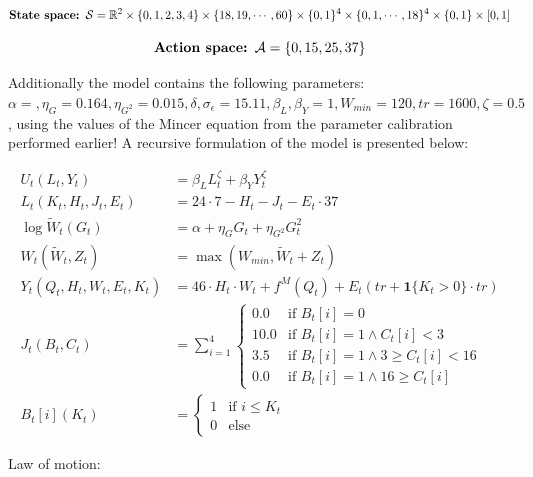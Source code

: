 \begin{equation}
    \textbf{State space: }\mathcal{S} = \mathbb{R}^2 \times \{0, 1, 2, 3, 4\} \times \{18, 19, \cdots , 60\} \times \{0, 1\}^4 \times \{0, 1, \cdots, 18\}^4 \times \{0,1\} \times [0, 1]
\end{equation}

\begin{equation}
    \textbf{Action space: }\mathcal{A} = \{0, 15, 25, 37\}
\end{equation}

Additionally the model contains the following parameters: $\alpha=, \eta_G = 0.164, \eta_{G^{2}}=0.015, \delta, \sigma_\epsilon = 15.11, \beta_L, \beta_Y = 1, W_{min} = 120, tr = 1600, \zeta=0.5$, using the values of the Mincer equation from the parameter calibration performed earlier! A recursive formulation of the model is presented below:

\begin{align}
    U_t(L_t, Y_t) &= \beta_L L_t^{\zeta} + \beta_Y Y_t^{\zeta}\\
    L_t(K_t, H_t, J_t, E_t) &= 24 \cdot 7 - H_t - J_t - E_t \cdot 37\\
    \log \tilde{W}_t (G_t) &= \alpha + \eta_G G_t + \eta_{G^2} G_t^2 \\
    W_t(\tilde{W}_t, Z_t) &= \max(W_{min} , \tilde{W}_t  + Z_t)  \\
    Y_t(Q_t,H_t, W_t, E_t, K_t) &= 46 \cdot H_t \cdot W_t + f^M(Q_t) +  E_t (tr + \mathbf{1} \{ K_t > 0 \} \cdot tr)\\
    J_t (B_t, C_t) &= \sum_{i=1}^4 \begin{cases}
        0.0 & \text{if } B_t[i] = 0 \\
        10.0 & \text{if } B_t[i] = 1 \land C_t[i] < 3 \\
        3.5 & \text{if } B_t[i] = 1 \land 3 \geq C_t[i] < 16 \\
        0.0 & \text{if } B_t[i] = 1 \land  16 \geq  C_t[i] 
    \end{cases} \\
    B_t[i] (K_t) &= \begin{cases}
        1 & \text{if }  i \leq K_t \\
        0 & \text{else}
    \end{cases}
\end{align}

Law of motion:

